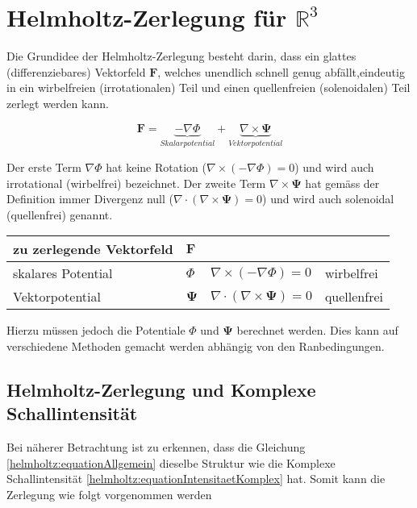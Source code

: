 %
%
%
%
\section{Helmholtz-Zerlegung für $\mathbb{R}^3$
\label{helmholtz:section:teil2}}

Die Grundidee der Helmholtz-Zerlegung besteht darin, dass ein glattes (differenziebares) Vektorfeld $\mathbf{F}$, welches unendlich schnell genug abfällt,eindeutig in ein wirbelfreien (irrotationalen) Teil und einen quellenfreien (solenoidalen) Teil zerlegt werden kann.

\begin{equation}
\mathbf{F} =  \underbrace{-\nabla \Phi}_{Skalarpotential} + \underbrace{\nabla \times \mathbf{\Psi}}_{Vektorpotential}
\label{helmholtz:equationAllgemein}
\end{equation}

Der erste Term $ \nabla \Phi $ hat keine Rotation ($\nabla \times (-\nabla \Phi) = 0$) und wird auch irrotational (wirbelfrei) bezeichnet. Der zweite Term $\nabla \times \mathbf{\Psi}$ hat gemäss der Definition immer Divergenz null ($\nabla \cdot (\nabla \times \mathbf{\Psi}) = 0$) und wird auch solenoidal (quellenfrei) genannt. \newline

\begin{tabular}[h]{l|l|l|l}
\hline
zu zerlegende Vektorfeld & $\mathbf{F}$ & & \\
\hline 
skalares Potential & $\Phi $ & $\nabla \times (-\nabla \Phi) = 0$ & wirbelfrei\\
\hline
Vektorpotential & $\mathbf{\Psi}$ & $\nabla \cdot (\nabla \times \mathbf{\Psi}) = 0$ & quellenfrei\\
\hline
\end{tabular}\newline

Hierzu müssen jedoch die Potentiale $\Phi $ und $\mathbf{\Psi}$ berechnet werden. Dies kann auf verschiedene Methoden gemacht werden abhängig von den Ranbedingungen.

\subsection{Helmholtz-Zerlegung und Komplexe Schallintensität}

Bei näherer Betrachtung ist zu erkennen, dass die Gleichung \eqref{helmholtz:equationAllgemein} dieselbe Struktur wie die Komplexe Schallintensität \eqref{helmholtz:equationIntensitaetKomplex} hat. Somit kann die Zerlegung wie folgt vorgenommen werden

